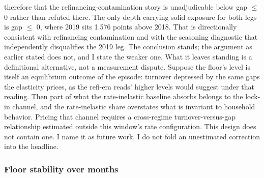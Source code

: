 \documentclass[12pt]{article}
\begin{document}
therefore that the refinancing-contamination story is unadjudicable below gap $\leq$ 0 rather than refuted there. The only depth carrying solid exposure for both legs is gap $\leq$ 0, where 2019 sits 1.576 points above 2018. That is directionally consistent with refinancing contamination and with the seasoning diagnostic that independently disqualifies the 2019 leg. The conclusion stands; the argument as earlier stated does not, and I state the weaker one. What it leaves standing is a definitional alternative, not a measurement dispute. Suppose the floor's level is itself an equilibrium outcome of the episode: turnover depressed by the same gaps the elasticity prices, as the refi-era reads' higher levels would suggest under that reading. Then part of what the rate-inelastic baseline absorbs belongs to the lock-in channel, and the rate-inelastic share overstates what is invariant to household behavior. Pricing that channel requires a cross-regime turnover-versus-gap relationship estimated outside this window's rate configuration. This design does not contain one. I name it as future work. I do not fold an unestimated correction into the headline.

\subsubsection{Floor stability over months}
\end{document}
